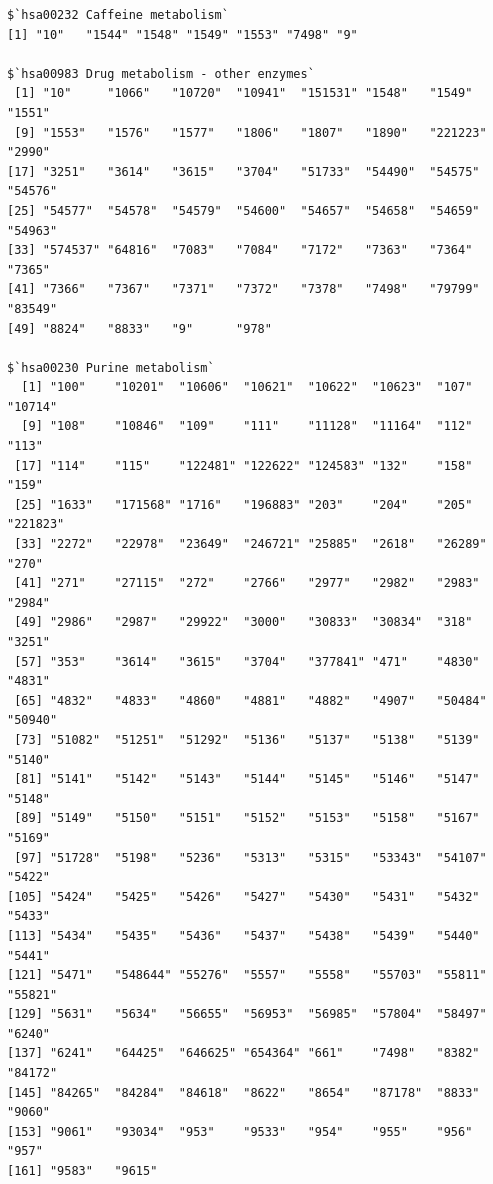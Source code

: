 \documentclass[
  letterpaper,
  DIV=11,
  numbers=noendperiod]{scrartcl}
\newenvironment{Shaded}{\begin{snugshade}}{\end{snugshade}}
\newcommand{\FunctionTok}[1]{\textcolor[rgb]{0.28,0.35,0.67}{#1}}
\newcommand{\NormalTok}[1]{\textcolor[rgb]{0.00,0.23,0.31}{#1}}
\newcommand{\OtherTok}[1]{\textcolor[rgb]{0.00,0.23,0.31}{#1}}
\newcommand{\SpecialCharTok}[1]{\textcolor[rgb]{0.37,0.37,0.37}{#1}}
\begin{document}
\begin{verbatim}
$`hsa00232 Caffeine metabolism`
[1] "10"   "1544" "1548" "1549" "1553" "7498" "9"   

$`hsa00983 Drug metabolism - other enzymes`
 [1] "10"     "1066"   "10720"  "10941"  "151531" "1548"   "1549"   "1551"  
 [9] "1553"   "1576"   "1577"   "1806"   "1807"   "1890"   "221223" "2990"  
[17] "3251"   "3614"   "3615"   "3704"   "51733"  "54490"  "54575"  "54576" 
[25] "54577"  "54578"  "54579"  "54600"  "54657"  "54658"  "54659"  "54963" 
[33] "574537" "64816"  "7083"   "7084"   "7172"   "7363"   "7364"   "7365"  
[41] "7366"   "7367"   "7371"   "7372"   "7378"   "7498"   "79799"  "83549" 
[49] "8824"   "8833"   "9"      "978"   

$`hsa00230 Purine metabolism`
  [1] "100"    "10201"  "10606"  "10621"  "10622"  "10623"  "107"    "10714" 
  [9] "108"    "10846"  "109"    "111"    "11128"  "11164"  "112"    "113"   
 [17] "114"    "115"    "122481" "122622" "124583" "132"    "158"    "159"   
 [25] "1633"   "171568" "1716"   "196883" "203"    "204"    "205"    "221823"
 [33] "2272"   "22978"  "23649"  "246721" "25885"  "2618"   "26289"  "270"   
 [41] "271"    "27115"  "272"    "2766"   "2977"   "2982"   "2983"   "2984"  
 [49] "2986"   "2987"   "29922"  "3000"   "30833"  "30834"  "318"    "3251"  
 [57] "353"    "3614"   "3615"   "3704"   "377841" "471"    "4830"   "4831"  
 [65] "4832"   "4833"   "4860"   "4881"   "4882"   "4907"   "50484"  "50940" 
 [73] "51082"  "51251"  "51292"  "5136"   "5137"   "5138"   "5139"   "5140"  
 [81] "5141"   "5142"   "5143"   "5144"   "5145"   "5146"   "5147"   "5148"  
 [89] "5149"   "5150"   "5151"   "5152"   "5153"   "5158"   "5167"   "5169"  
 [97] "51728"  "5198"   "5236"   "5313"   "5315"   "53343"  "54107"  "5422"  
[105] "5424"   "5425"   "5426"   "5427"   "5430"   "5431"   "5432"   "5433"  
[113] "5434"   "5435"   "5436"   "5437"   "5438"   "5439"   "5440"   "5441"  
[121] "5471"   "548644" "55276"  "5557"   "5558"   "55703"  "55811"  "55821" 
[129] "5631"   "5634"   "56655"  "56953"  "56985"  "57804"  "58497"  "6240"  
[137] "6241"   "64425"  "646625" "654364" "661"    "7498"   "8382"   "84172" 
[145] "84265"  "84284"  "84618"  "8622"   "8654"   "87178"  "8833"   "9060"  
[153] "9061"   "93034"  "953"    "9533"   "954"    "955"    "956"    "957"   
[161] "9583"   "9615"  
\end{verbatim}

\begin{Shaded}
\end{Shaded}
\end{document}

